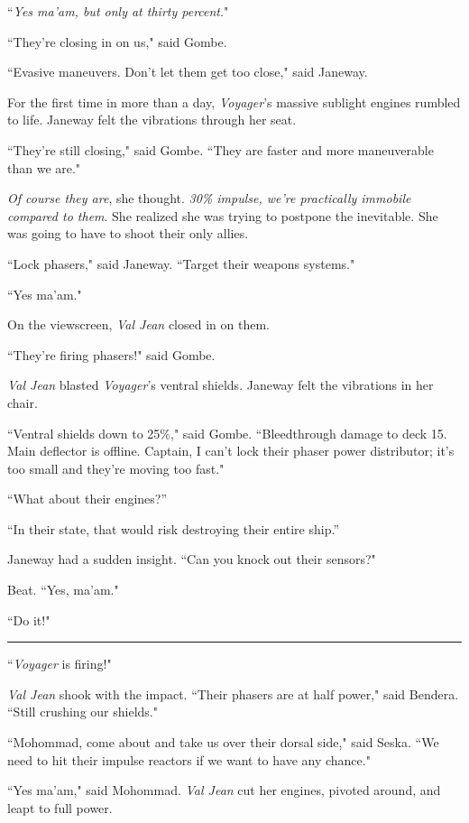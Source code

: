 \documentclass[twoside,letterpaper,12pt]{memoir}
\begin{document}
``\textit{Yes ma'am, but only at thirty percent}."

``They're closing in on us," said Gombe.

``Evasive maneuvers. Don't let them get too close," said Janeway.

For the first time in more than a day, \textit{Voyager}'s massive sublight engines rumbled to life. Janeway felt the vibrations through her seat.

``They're still closing," said Gombe. ``They are faster and more maneuverable than we are."

\textit{Of course they are}, she thought. \textit{30\% impulse, we're practically immobile compared to them}. She realized she was trying to postpone the inevitable. She was going to have to shoot their only allies.

``Lock phasers," said Janeway. ``Target their weapons systems."

``Yes ma'am."

On the viewscreen, \textit{Val Jean} closed in on them.

``They're firing phasers!" said Gombe.

\textit{Val Jean} blasted \textit{Voyager}'s ventral shields. Janeway felt the vibrations in her chair.

``Ventral shields down to 25\%," said Gombe. ``Bleedthrough damage to deck 15. Main deflector is offline. Captain, I can't lock their phaser power distributor; it’s too small and they’re moving too fast."

``What about their engines?''

``In their state, that would risk destroying their entire ship.''

Janeway had a sudden insight. ``Can you knock out their sensors?"

Beat. ``Yes, ma'am."

``Do it!"

\begin{center}\rule{3cm}{0.4 pt}\end{center}

\noindent``\textit{Voyager} is firing!"

\textit{Val Jean} shook with the impact. ``Their phasers are at half power," said Bendera. ``Still crushing our shields."

``Mohommad, come about and take us over their dorsal side," said Seska. ``We need to hit their impulse reactors if we want to have any chance."

``Yes ma'am," said Mohommad. \textit{Val Jean} cut her engines, pivoted around, and leapt to full power.
\end{document}
